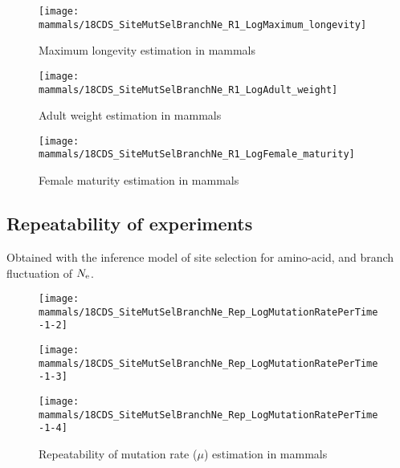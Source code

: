 \begin{figure}[H]
    \centering
    \texttt{[image: mammals/18CDS\_SiteMutSelBranchNe\_R1\_LogMaximum\_longevity]}
    \caption[Maximum longevity estimation in mammals]{Maximum longevity estimation in mammals}
\end{figure}

\begin{figure}[H]
    \centering
    \texttt{[image: mammals/18CDS\_SiteMutSelBranchNe\_R1\_LogAdult\_weight]}
    \caption[Adult weight estimation in mammals]{Adult weight estimation in mammals}
\end{figure}

\begin{figure}[H]
    \centering
    \texttt{[image: mammals/18CDS\_SiteMutSelBranchNe\_R1\_LogFemale\_maturity]}
    \caption[Female maturity estimation in mammals]{Female maturity estimation in mammals}
\end{figure}

\subsection{Repeatability of experiments}
Obtained with the inference model of site selection for amino-acid, and branch fluctuation of $N_{\mathrm{e}}$.

\begin{figure}[H]
    \centering
    \begin{minipage}{0.32\linewidth}
        \texttt{[image: mammals/18CDS\_SiteMutSelBranchNe\_Rep\_LogMutationRatePerTime-1-2]}
    \end{minipage}    \hfill
    \begin{minipage}{0.32\linewidth}
        \texttt{[image: mammals/18CDS\_SiteMutSelBranchNe\_Rep\_LogMutationRatePerTime-1-3]}
    \end{minipage}    \hfill
    \begin{minipage}{0.32\linewidth}
        \texttt{[image: mammals/18CDS\_SiteMutSelBranchNe\_Rep\_LogMutationRatePerTime-1-4]}
    \end{minipage}
    \caption[Repeatability of mutation rate estimation in mammals]{Repeatability of mutation rate ($\mu$) estimation in mammals}
\end{figure}

